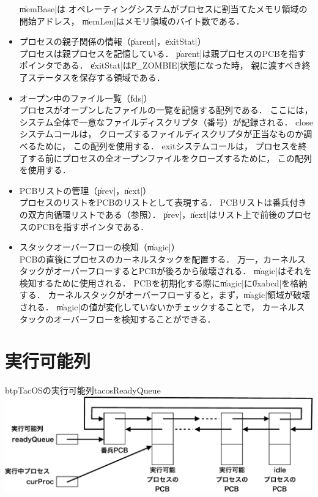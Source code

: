 \begin{itemize}
  \|memBase|は
  オペレーティングシステムがプロセスに割当てたメモリ領域の開始アドレス，
  \|memLen|はメモリ領域のバイト数である．
\item プロセスの親子関係の情報（\|parent|，\|exitStat|） \\
  プロセスは親プロセスを記憶している．
  \|parent|は親プロセスのPCBを指すポインタである．
  \|exitStat|は\|P_ZOMBIE|状態になった時，
  親に渡すべき終了ステータスを保存する領域である．
\item オープン中のファイル一覧（\|fds|） \\
  プロセスがオープンしたファイルの一覧を記憶する配列である．
  ここには，システム全体で一意なファイルディスクリプタ（番号）が記録される．
  closeシステムコールは，
  クローズするファイルディスクリプタが正当なものか調べるために，
  この配列を使用する．
  exitシステムコールは，
  プロセスを終了する前にプロセスの全オープンファイルをクローズするために，
  この配列を使用する．
\item PCBリストの管理（\|prev|，\|next|） \\
  プロセスのリストをPCBのリストとして表現する．
  PCBリストは番兵付きの双方向循環リストである（参照）．
  \|prev|，\|next|はリスト上で前後のプロセスのPCBを指すポインタである．
\item スタックオーバーフローの検知（\|magic|） \\
  PCBの直後にプロセスのカーネルスタックを配置する．
  万一，カーネルスタックがオーバーフローするとPCBが後ろから破壊される．
  \|magic|はそれを検知するために使用される．
  PCBを初期化する際に\|magic|に\|0xabcd|を格納する．
  カーネルスタックがオーバーフローすると，まず，\|magic|領域が破壊される．
  \|magic|の値が変化していないかチェックすることで，
  カーネルスタックのオーバーフローを検知することができる．
\end{itemize}

\section{実行可能列}

\begin{myfig}{btp}{TacOSの実行可能列}{tacosReadyQueue}
  \includegraphics[scale=0.6]{Fig/tacosReadyQueue-crop.pdf}
\end{myfig}

